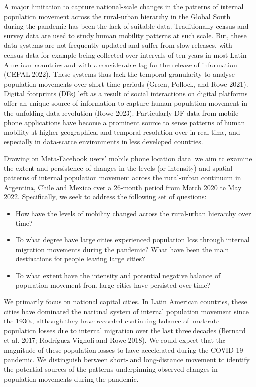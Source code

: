 \documentclass[
  11pt,
]{article}
\begin{document}
A major limitation to capture national-scale changes in the patterns of
internal population movement across the rural-urban hierarchy in the
Global South during the pandemic has been the lack of suitable data.
Traditionally census and survey data are used to study human mobility
patterns at such scale. But, these data systems are not frequently
updated and suffer from slow releases, with census data for example
being collected over intervals of ten years in most Latin American
countries and with a considerable lag for the release of information
(CEPAL 2022). These systems thus lack the temporal granularity to
analyse population movements over short-time periods (Green, Pollock,
and Rowe 2021). Digital footprints (DFs) left as a result of social
interactions on digital platforms offer an unique source of information
to capture human population movement in the unfolding data revolution
(Rowe 2023). Particularly DF data from mobile phone applications have
become a prominent source to sense patterns of human mobility at higher
geographical and temporal resolution over in real time, and especially
in data-scarce environments in less developed countries.

Drawing on Meta-Facebook users' mobile phone location data, we aim to
examine the extent and persistence of changes in the levels (or
intensity) and spatial patterns of internal population movement across
the rural-urban continuum in Argentina, Chile and Mexico over a 26-month
period from March 2020 to May 2022. Specifically, we seek to address the
following set of questions:

\begin{itemize}
\item
  How have the levels of mobility changed across the rural-urban
  hierarchy over time?
\item
  To what degree have large cities experienced population loss through
  internal migration movements during the pandemic? What have been the
  main destinations for people leaving large cities?
\item
  To what extent have the intensity and potential negative balance of
  population movement from large cities have persisted over time?
\end{itemize}

We primarily focus on national capital cities. In Latin American
countries, these cities have dominated the national system of internal
population movement since the 1930s, although they have recorded
continuing balance of moderate population losses due to internal
migration over the last three decades (Bernard et al. 2017;
Rodríguez-Vignoli and Rowe 2018). We could expect that the magnitude of
these population losses to have accelerated during the COVID-19
pandemic. We distinguish between short- and long-distance movement to
identify the potential sources of the patterns underpinning observed
changes in population movements during the pandemic.
\end{document}
